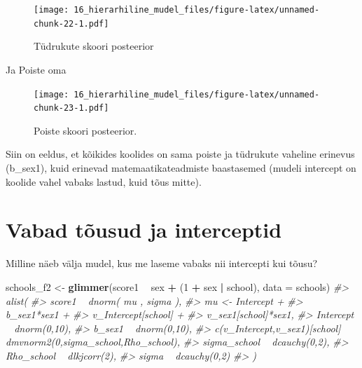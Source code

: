 \documentclass[]{book}
\newenvironment{Shaded}{\begin{snugshade}}{\end{snugshade}}
\newcommand{\KeywordTok}[1]{\textcolor[rgb]{0.13,0.29,0.53}{\textbf{#1}}}
\newcommand{\DataTypeTok}[1]{\textcolor[rgb]{0.13,0.29,0.53}{#1}}
\newcommand{\DecValTok}[1]{\textcolor[rgb]{0.00,0.00,0.81}{#1}}
\newcommand{\StringTok}[1]{\textcolor[rgb]{0.31,0.60,0.02}{#1}}
\newcommand{\CommentTok}[1]{\textcolor[rgb]{0.56,0.35,0.01}{\textit{#1}}}
\newcommand{\OperatorTok}[1]{\textcolor[rgb]{0.81,0.36,0.00}{\textbf{#1}}}
\newcommand{\NormalTok}[1]{#1}
\begin{document}
\begin{figure}
\centering
\texttt{[image: 16\_hierarhiline\_mudel\_files/figure-latex/unnamed-chunk-22-1.pdf]}
\caption{\label{fig:unnamed-chunk-22}Tüdrukute skoori posteerior}
\end{figure}

Ja Poiste oma

\begin{Shaded}
\end{Shaded}

\begin{figure}
\centering
\texttt{[image: 16\_hierarhiline\_mudel\_files/figure-latex/unnamed-chunk-23-1.pdf]}
\caption{\label{fig:unnamed-chunk-23}Poiste skoori posteerior.}
\end{figure}

Siin on eeldus, et kõikides koolides on sama poiste ja tüdrukute
vaheline erinevus (b\_sex1), kuid erinevad matemaatikateadmiste
baastasemed (mudeli intercept on koolide vahel vabaks lastud, kuid tõus
mitte).

\section{Vabad tõusud ja interceptid}\label{vabad-tousud-ja-interceptid}

Milline näeb välja mudel, kus me laseme vabaks nii intercepti kui tõusu?

\begin{Shaded}
\begin{Highlighting}[]
\NormalTok{schools_f2 <-}\StringTok{ }\KeywordTok{glimmer}\NormalTok{(score1 }\OperatorTok{~}\StringTok{ }\NormalTok{sex }\OperatorTok{+}\StringTok{ }\NormalTok{(}\DecValTok{1} \OperatorTok{+}\StringTok{ }\NormalTok{sex }\OperatorTok{|}\StringTok{ }\NormalTok{school), }\DataTypeTok{data =}\NormalTok{ schools)}
\CommentTok{#> alist(}
\CommentTok{#>     score1 ~ dnorm( mu , sigma ),}
\CommentTok{#>     mu <- Intercept +}
\CommentTok{#>         b_sex1*sex1 +}
\CommentTok{#>         v_Intercept[school] +}
\CommentTok{#>         v_sex1[school]*sex1,}
\CommentTok{#>     Intercept ~ dnorm(0,10),}
\CommentTok{#>     b_sex1 ~ dnorm(0,10),}
\CommentTok{#>     c(v_Intercept,v_sex1)[school] ~ dmvnorm2(0,sigma_school,Rho_school),}
\CommentTok{#>     sigma_school ~ dcauchy(0,2),}
\CommentTok{#>     Rho_school ~ dlkjcorr(2),}
\CommentTok{#>     sigma ~ dcauchy(0,2)}
\CommentTok{#> )}
\end{Highlighting}
\end{Shaded}
\end{document}
